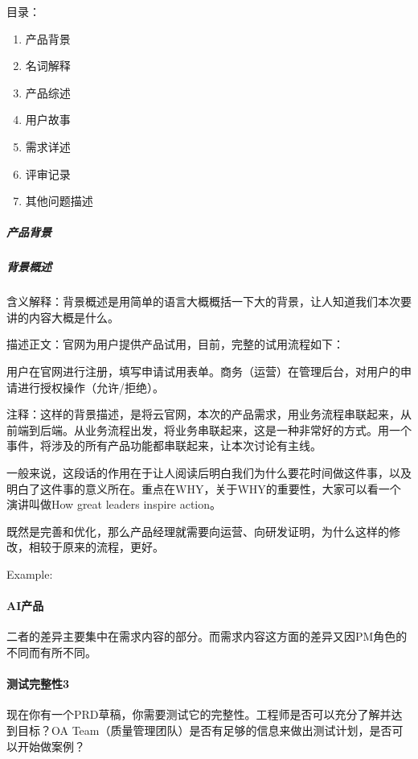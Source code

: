 \documentclass[letterpaper,11pt,english]{sphinxmanual}
\begin{document}
目录：
\begin{enumerate}
%
\item {} 
产品背景

\item {} 
名词解释

\item {} 
产品综述

\item {} 
用户故事

\item {} 
需求详述

\item {} 
评审记录

\item {} 
其他问题描述

\end{enumerate}


\subparagraph{产品背景}
\label{\detokenize{chapter_skill/PRD:id8}}

\subparagraph{背景概述}
\label{\detokenize{chapter_skill/PRD:id9}}
含义解释：背景概述是用简单的语言大概概括一下大的背景，让人知道我们本次要讲的内容大概是什么。

描述正文：官网为用户提供产品试用，目前，完整的试用流程如下：

用户在官网进行注册，填写申请试用表单。商务（运营）在管理后台，对用户的申请进行授权操作（允许/拒绝）。

注释：这样的背景描述，是将云官网，本次的产品需求，用业务流程串联起来，从前端到后端。从业务流程出发，将业务串联起来，这是一种非常好的方式。用一个事件，将涉及的所有产品功能都串联起来，让本次讨论有主线。

一般来说，这段话的作用在于让人阅读后明白我们为什么要花时间做这件事，以及明白了这件事的意义所在。重点在WHY，关于WHY的重要性，大家可以看一个演讲叫做How
great leaders inspire action。

既然是完善和优化，那么产品经理就需要向运营、向研发证明，为什么这样的修改，相较于原来的流程，更好。

Example: 


\paragraph{AI产品}
\label{\detokenize{chapter_skill/PRD:ai}}
二者的差异主要集中在需求内容的部分。而需求内容这方面的差异又因PM角色的不同而有所不同。


\paragraph{测试完整性3\sphinxfootnotemark[182]}
\label{\detokenize{chapter_skill/PRD:id10}}%
\begin{footnotetext}[182]\sphinxAtStartFootnote
{}
%
\end{footnotetext}\ignorespaces 
现在你有一个PRD草稿，你需要测试它的完整性。工程师是否可以充分了解并达到目标？OA
Team（质量管理团队）是否有足够的信息来做出测试计划，是否可以开始做案例？
\end{document}
